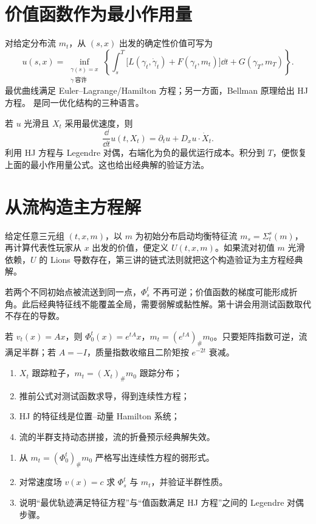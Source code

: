 \section{价值函数作为最小作用量}

对给定分布流 $m_t$，从 $(s,x)$ 出发的确定性价值可写为
\[
u(s,x)=\inf_{\substack{\gamma(s)=x\\\dot\gamma\ \text{容许}}}
\left\{
\int_s^T\bigl[L(\gamma_t,\dot\gamma_t)+F(\gamma_t,m_t)\bigr]\dd t
+G(\gamma_T,m_T)
\right\}.
\]
最优曲线满足 Euler--Lagrange/Hamilton 方程；另一方面，Bellman 原理给出 HJ 方程。 是同一优化结构的三种语言。

\begin{derivation}[沿特征线恢复价值]
若 $u$ 光滑且 $X_t$ 采用最优速度，则
\[
\frac{\dd}{\dd t}u(t,X_t)
=\partial_tu+D_xu\cdot\dot X_t.
\]
利用 HJ 方程与 Legendre 对偶，右端化为负的最优运行成本。积分到 $T$，便恢复上面的最小作用量公式。这也给出经典解的验证方法。
\end{derivation}

\section{从流构造主方程解}

给定任意三元组 $(t,x,m)$，以 $m$ 为初始分布启动均衡特征流 $m_s=\Sigma_t^s(m)$，再计算代表性玩家从 $x$ 出发的价值，便定义 $U(t,x,m)$。如果流对初值 $m$ 光滑依赖，$U$ 的 Lions 导数存在，第三讲的链式法则就把这个构造验证为主方程经典解。

\begin{pitfall}[特征线交叉就是光滑性危机]
若两个不同初始点被流送到同一点，$\Phi_s^t$ 不再可逆；价值函数的梯度可能形成折角。此后经典特征线不能覆盖全局，需要弱解或黏性解。第十讲会用测试函数取代不存在的导数。
\end{pitfall}

\begin{examplebox}[线性流]
若 $v_t(x)=Ax$，则 $\Phi_0^t(x)=e^{tA}x$，$m_t=(e^{tA})_\#m_0$。只要矩阵指数可逆，流满足半群；若 $A=-I$，质量指数收缩且二阶矩按 $e^{-2t}$ 衰减。
\end{examplebox}

\begin{takeaway}
\begin{enumerate}
  \item $X_t$ 跟踪粒子，$m_t=(X_t)_\#m_0$ 跟踪分布；
  \item 推前公式对测试函数求导，得到连续性方程；
  \item HJ 的特征线是位置--动量 Hamilton 系统；
  \item 流的半群支持动态拼接，流的折叠预示经典解失效。
\end{enumerate}
\end{takeaway}

\begin{exercisebox}
\begin{enumerate}
  \item 从 $m_t=(\Phi_0^t)_\#m_0$ 严格写出连续性方程的弱形式。
  \item 对常速度场 $v(x)=c$ 求 $\Phi_s^t$ 与 $m_t$，并验证半群性质。
  \item 说明“最优轨迹满足特征方程”与“值函数满足 HJ 方程”之间的 Legendre 对偶步骤。
\end{enumerate}
\end{exercisebox}
